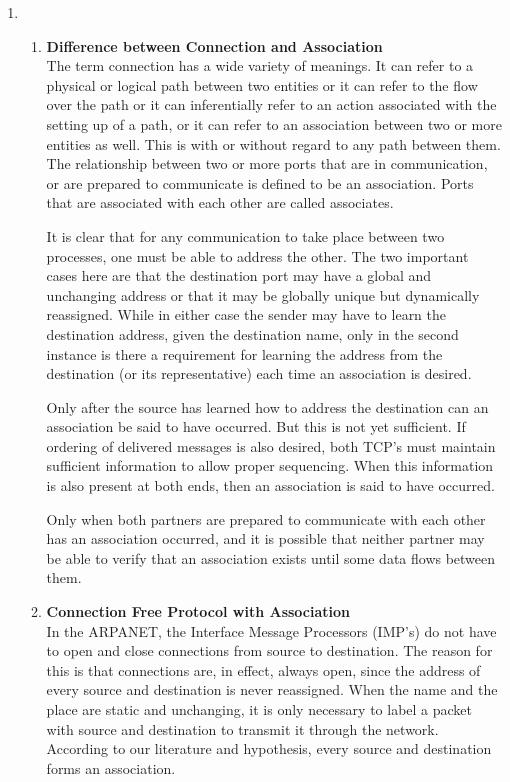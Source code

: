 \documentclass[12pt]{article}
\begin{document}
\begin{enumerate}
\item
\begin{enumerate}[label=(\alph*)] %
\item \textbf{Difference between Connection and Association} \\
The term connection has a wide variety of meanings. It can refer to a physical or logical path between two entities or it can refer to the flow over the path or it can inferentially refer to an action associated with the setting up of a path, or it can refer to an association between two or more entities as well. This is with or without regard to any path between them. The relationship between two or more ports that are in communication, or are prepared to communicate is defined to be an association. Ports that are associated with
each other are called associates. 

It is clear that for any communication to take place between two processes, one must be able to address the other. The two important cases here are that the destination port may have a global and unchanging address or that it may be globally unique but dynamically reassigned. While in either case the sender may have to learn the destination address, given the destination name, only in the second instance is there a requirement for learning the address from the destination (or its representative) each time an association is desired.

Only after the source has learned how to address the destination can an association be said to have occurred. But this is not yet sufficient. If ordering of delivered messages is also desired, both TCP’s must maintain sufficient information to allow proper sequencing. When this information is also present at both ends, then an association is said to have occurred.

Only when both partners are prepared to communicate with each other has an association occurred, and it is possible that neither partner may be able to verify that an association exists until some data flows between
them.
\item \textbf{Connection Free Protocol with Association} \\
In the ARPANET, the Interface Message Processors (IMP's) do not have to open and close connections from source to destination. The reason for this is that connections are, in effect, always open, since the address of every source and destination is never reassigned. When the name and the place are static and unchanging, it is only necessary to label a packet with source and destination to transmit it through the network. According to our literature and hypothesis, every source and destination forms an association. 


\end{enumerate}
\end{enumerate}
\end{document}
